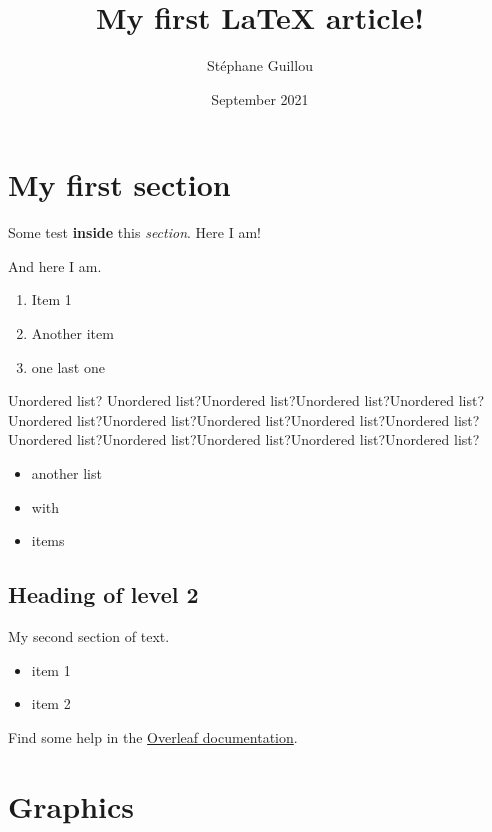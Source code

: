 \documentclass{article}
\title{My first LaTeX article!}
\author{Stéphane Guillou}
\date{September 2021}
\begin{document}
\maketitle

\section{My first section}

Some test \textbf{inside} this \textit{section}. Here I am!

And here I am.

\begin{enumerate}
    \item Item 1
    \item Another item
    \item one last one
\end{enumerate}

Unordered list? Unordered list?Unordered list?Unordered list?Unordered list?Unordered list?Unordered list?Unordered list?Unordered list?Unordered list?Unordered list?Unordered list?Unordered list?Unordered list?Unordered list?

\begin{itemize}
    \item another list
    \item with
    \item items
\end{itemize}

\subsection{Heading of level 2}

My second section of text.

\begin{itemize}
    \item item 1
    \item item 2
\end{itemize}

Find some help in the \href{https://www.overleaf.com/learn/latex/Page_size_and_margins}{Overleaf documentation}.

\section{Graphics}
\end{document}
